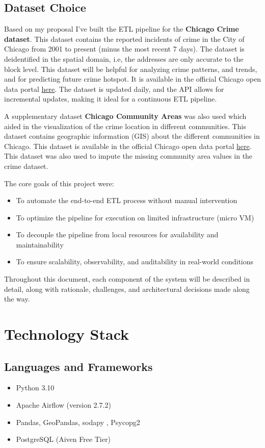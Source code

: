 \documentclass[12pt]{article}
\begin{document}
\subsection*{Dataset Choice}
Based on my proposal I've built the ETL pipeline for the \textbf{Chicago Crime dataset}. This dataset contains the reported incidents of crime in the City of Chicago from 2001 to present (minus the most recent 7 days). The dataset is deidentified in the spatial domain, i.e, the addresses are only accurate to the block level. This dataset will be helpful for analyzing crime patterns, and trends, and for predicting future crime hotspot. It is available in the official Chicago open data portal \href{https://data.cityofchicago.org/Public-Safety/Crimes-2001-to-Present/ijzp-q8t2}{here}. The dataset is updated daily, and the API allows for incremental updates, making it ideal for a continuous ETL pipeline.


A supplementary dataset \textbf{Chicago Community Areas} was also used which aided in the visualization of the crime location in different communities. This dataset contains geographic information (GIS) about the different communities in Chicago. This dataset is available in the official Chicago open data portal \href{https://data.cityofchicago.org/Community-Areas/Community-Areas-GeoJSON/4ykn-5ajh}{here}. This dataset was also used to impute the missing community area values in the crime dataset.


The core goals of this project were:
\begin{itemize}
\item To automate the end-to-end ETL process without manual intervention
\item To optimize the pipeline for execution on limited infrastructure (micro VM)
\item To decouple the pipeline from local resources for availability and maintainability
\item To ensure scalability, observability, and auditability in real-world conditions
\end{itemize}

Throughout this document, each component of the system will be described in detail, along with rationale, challenges, and architectural decisions made along the way.

\section{Technology Stack}

\subsection*{Languages and Frameworks}
\begin{itemize}
\item Python 3.10
\item Apache Airflow (version 2.7.2)
\item Pandas, GeoPandas, sodapy , Psycopg2
\item PostgreSQL (Aiven Free Tier)
\end{itemize}
\end{document}
